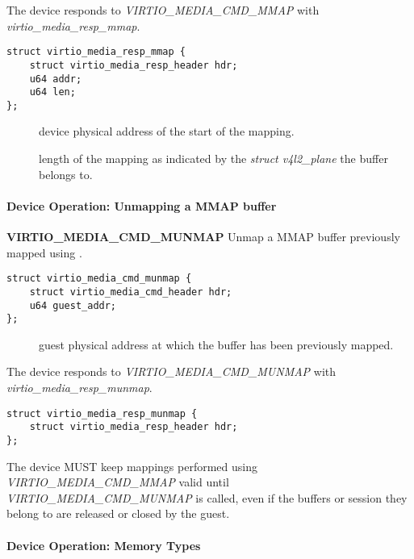 The device responds to \textit{VIRTIO_MEDIA_CMD_MMAP} with \textit{virtio_media_resp_mmap}.

\begin{lstlisting}
struct virtio_media_resp_mmap {
    struct virtio_media_resp_header hdr;
    u64 addr;
    u64 len;
};
\end{lstlisting}

\begin{description}
\item[] device physical address of the start of the mapping.
\item[] length of the mapping as indicated by the \textit{struct v4l2_plane}
the buffer belongs to.
\end{description}

\paragraph{Device Operation: Unmapping a MMAP buffer}

\textbf{VIRTIO_MEDIA_CMD_MUNMAP} Unmap a MMAP buffer previously mapped using .

\begin{lstlisting}
struct virtio_media_cmd_munmap {
    struct virtio_media_cmd_header hdr;
    u64 guest_addr;
};
\end{lstlisting}

\begin{description}
\item[] guest physical address at which the buffer has been previously mapped.
\end{description}

The device responds to \textit{VIRTIO_MEDIA_CMD_MUNMAP} with \textit{virtio_media_resp_munmap}.

\begin{lstlisting}
struct virtio_media_resp_munmap {
    struct virtio_media_resp_header hdr;
};
\end{lstlisting}


The device MUST keep mappings performed using \textit{VIRTIO_MEDIA_CMD_MMAP}
valid until \textit{VIRTIO_MEDIA_CMD_MUNMAP} is called, even if the buffers or
session they belong to are released or closed by the guest.

\paragraph{Device Operation: Memory Types}

